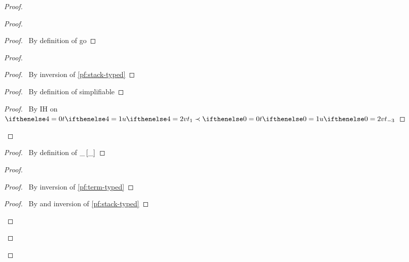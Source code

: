 \documentclass[a4paper]{article}
\begin{document}
\begin{proof}
\begin{proof}
    \begin{proof}
      \pf\ By definition of \textsf{go}
    \end{proof}
     \begin{proof}
      \begin{proof}
        \pf\ By inversion of \ref{pf:stack-typed}
      \end{proof}
      \begin{proof}
        \pf\ By definition of simplifiable
      \end{proof}
      \qedstep
      \begin{proof}
        \pf\ By IH on $\aTerm[4] \prec  \aTerm$
      \end{proof}
    \end{proof}
    \begin{proof}
      \pf\ By definition of $\_ \left[ \_ \right]$
    \end{proof}
    \begin{proof}
      \begin{proof}
        \pf\ By inversion of \ref{pf:term-typed}
      \end{proof}
      \begin{proof}
        \pf\ By  and inversion of \ref{pf:stack-typed}

\end{proof}
\end{proof}
\end{proof}
\end{proof}
\end{document}
